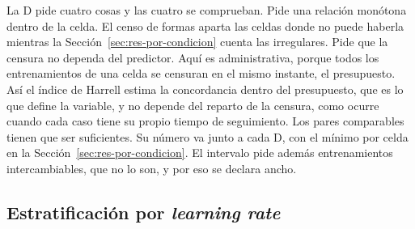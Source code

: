 La D pide cuatro cosas y las cuatro se comprueban. Pide una relación monótona dentro de la celda. El censo de formas aparta las celdas donde no puede haberla mientras la Sección~\ref{sec:res-por-condicion} cuenta las irregulares. Pide que la censura no dependa del predictor. Aquí es administrativa, porque todos los entrenamientos de una celda se censuran en el mismo instante, el presupuesto. Así el índice de Harrell estima la concordancia dentro del presupuesto, que es lo que define la variable, y no depende del reparto de la censura, como ocurre cuando cada caso tiene su propio tiempo de seguimiento. Los pares comparables tienen que ser suficientes. Su número va junto a cada D, con el mínimo por celda en la Sección~\ref{sec:res-por-condicion}. El intervalo pide además entrenamientos intercambiables, que no lo son, y por eso se declara ancho.

\subsection{Estratificación por \emph{learning rate}}
\label{sec:protocolo-granulada}

